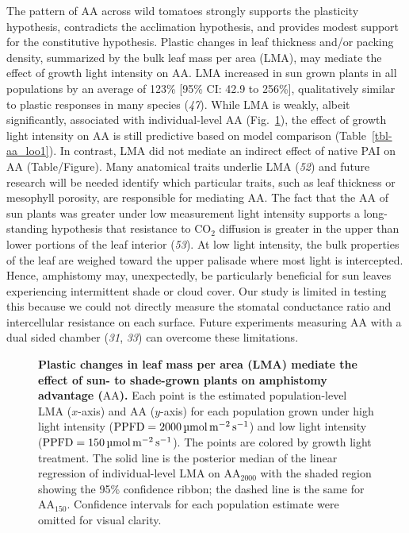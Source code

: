 \documentclass[
  letterpaper,
  DIV=11,
  numbers=noendperiod]{scrartcl}
\newcommand{\aahigh}{\mathrm{AA}_{2000}}
\newcommand{\aalow}{\mathrm{AA}_{150}}
\newcommand{\aax}{$\mathrm{AA}$}
\newcommand{\ppfdequals}[1]{$\mathrm{PPFD} = \qty{#1}{\micro\mol\raiseto{-2}\meter\raiseto{-1}\second}$}
\begin{document}
The pattern of \aax{} across wild tomatoes strongly supports the
plasticity hypothesis, contradicts the acclimation hypothesis, and
provides modest support for the constitutive hypothesis. Plastic changes
in leaf thickness and/or packing density, summarized by the bulk leaf
mass per area (LMA), may mediate the effect of growth light intensity on
\aax{}. LMA increased in sun grown plants in all populations by an
average of 123\% {[}95\% CI: 42.9 to 256\%{]}, qualitatively similar to
plastic responses in many species (\emph{47}). While LMA is weakly,
albeit significantly, associated with individual-level \aax{}
(Fig.~\ref{fig-lma_aa}), the effect of growth light intensity on \aax{}
is still predictive based on model comparison (Table~\ref{tbl-aa_loo1}).
In contrast, LMA did not mediate an indirect effect of native PAI on
\aax{} (Table/Figure). Many anatomical traits underlie LMA (\emph{52})
and future research will be needed identify which particular traits,
such as leaf thickness or mesophyll porosity, are responsible for
mediating \aax{}. The fact that the \aax{} of sun plants was greater
under low measurement light intensity supports a long-standing
hypothesis that resistance to CO\(_2\) diffusion is greater in the upper
than lower portions of the leaf interior (\emph{53}). At low light
intensity, the bulk properties of the leaf are weighed toward the upper
palisade where most light is intercepted. Hence, amphistomy may,
unexpectedly, be particularly beneficial for sun leaves experiencing
intermittent shade or cloud cover. Our study is limited in testing this
because we could not directly measure the stomatal conductance ratio and
intercellular resistance on each surface. Future experiments measuring
\aax{} with a dual sided chamber (\emph{31}, \emph{33}) can overcome
these limitations.

\begin{figure}


\caption{\label{fig-lma_aa}\textbf{Plastic changes in leaf mass per area (LMA) mediate the effect of sun- to shade-grown plants on amphistomy advantage (\aax{}).}
Each point is the estimated population-level LMA (\(x\)-axis) and \aax{}
(\(y\)-axis) for each population grown under high light intensity
(\ppfdequals{2000}) and low light intensity (\ppfdequals{150}). The
points are colored by growth light treatment. The solid line is the
posterior median of the linear regression of individual-level LMA on
\(\aahigh\) with the shaded region showing the 95\% confidence ribbon;
the dashed line is the same for \(\aalow\). Confidence intervals for
each population estimate were omitted for visual clarity.}

\end{figure}%
\end{document}
